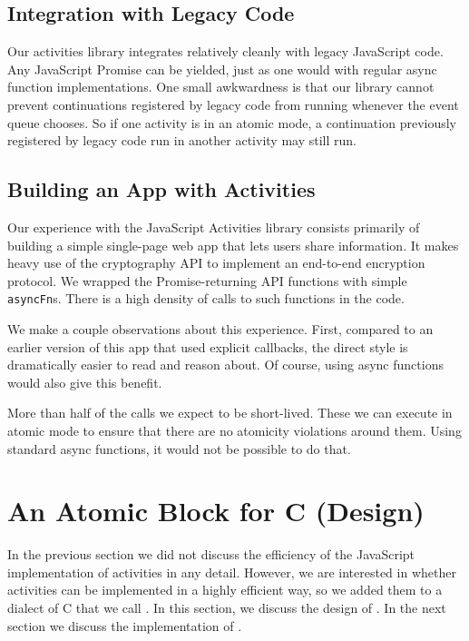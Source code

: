 \documentclass[sigplan,10pt,review,anonymous]{acmart}\settopmatter{printfolios=true,printccs=false,printacmref=false}
\begin{document}
\subsection{Integration with Legacy Code}

Our activities library integrates relatively cleanly with legacy JavaScript code.
Any JavaScript Promise can be yielded, just as one would with regular async function implementations.
One small awkwardness is that our library cannot prevent continuations registered by legacy code from running whenever the event queue chooses.
So if one activity is in an atomic mode, a continuation previously registered by legacy code run in another activity may still run.

\subsection{Building an App with Activities}

Our experience with the JavaScript Activities library consists primarily of building a simple single-page web app that lets users share information.
It makes heavy use of the cryptography API to implement an end-to-end encryption protocol.
We wrapped the Promise-returning API functions with simple \texttt{asyncFn}s.
There is a high density of calls to such functions in the code.

We make a couple observations about this experience.
First, compared to an earlier version of this app that used explicit callbacks, the direct style is dramatically easier to read and reason about.
Of course, using async functions would also give this benefit.

More than half of the calls we expect to be short-lived.
These we can execute in atomic mode to ensure that there are no atomicity violations around them.
Using standard async functions, it would not be possible to do that.

\section{An Atomic Block for C (Design)}

In the previous section we did not discuss the efficiency of the JavaScript implementation of activities in any detail.
However, we are interested in whether activities can be implemented in a highly efficient way, so we added them to a dialect of C that we call \charcoal{}.
In this section, we discuss the design of \charcoal{}.
In the next section we discuss the implementation of \charcoal{}.
\end{document}
